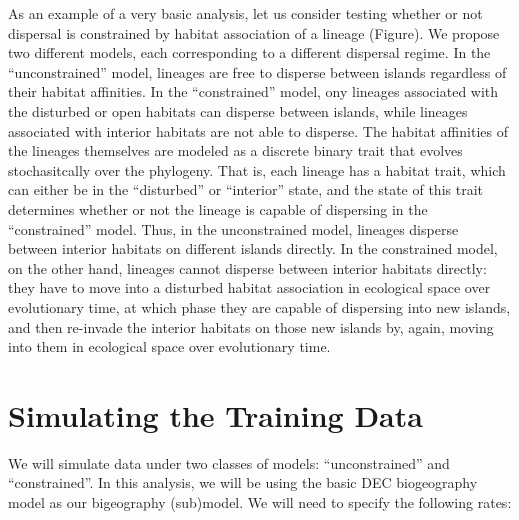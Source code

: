 \documentclass[11pt,openany]{memoir} %
\begin{document}
As an example of a very basic analysis, let us consider testing whether or not dispersal is constrained by habitat association of a lineage (Figure).
We propose two different models, each corresponding to a different dispersal regime.
In the ``unconstrained'' model, lineages are free to disperse between islands regardless of their habitat affinities.
In the ``constrained'' model, ony lineages associated with the disturbed or open habitats can disperse between islands, while lineages associated with interior habitats are not able to disperse.
The habitat affinities of the lineages themselves are modeled as a discrete binary trait that evolves stochasitcally over the phylogeny.
That is, each lineage has a habitat trait, which can either be in the ``disturbed'' or ``interior'' state, and the state of this trait determines whether or not the lineage is capable of dispersing in the ``constrained'' model.
Thus, in the unconstrained model, lineages disperse between interior habitats on different islands directly.
In the constrained model, on the other hand, lineages cannot disperse between interior habitats directly: they have to move into a disturbed habitat association in ecological space over evolutionary time, at which phase they are capable of dispersing into new islands, and then re-invade the interior habitats on those new islands by, again, moving into them in ecological space over evolutionary time.

\section{Simulating the Training Data}

We will simulate data under two classes of models: ``unconstrained'' and ``constrained''.
In this analysis, we will be using the basic DEC biogeography model as our bigeography (sub)model.
We will need to specify the following rates:
\end{document}
